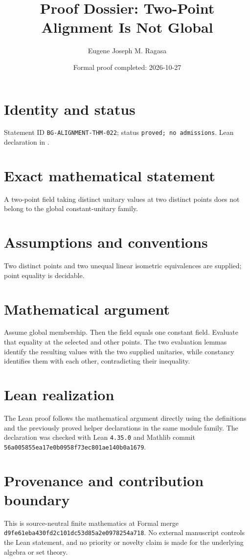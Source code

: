 \documentclass[11pt]{article}
\title{Proof Dossier: Two-Point Alignment Is Not Global}
\author{Eugene Joseph M. Ragasa}
\date{Formal proof completed: 2026-10-27}
\begin{document}
\raggedright
\maketitle

\section{Identity and status}
Statement ID \texttt{BG-ALIGNMENT-THM-022}; status \texttt{proved; no admissions}.  Lean declaration
 in
.

\section{Exact mathematical statement}
A two-point field taking distinct unitary values at two distinct points does not belong to the global constant-unitary family.

\section{Assumptions and conventions}
Two distinct points and two unequal linear isometric equivalences are supplied; point equality is decidable.

\section{Mathematical argument}
Assume global membership.  Then the field equals one constant field.  Evaluate that equality at the selected and other points.  The two evaluation lemmas identify the resulting values with the two supplied unitaries, while constancy identifies them with each other, contradicting their inequality.

\section{Lean realization}
The Lean proof follows the mathematical argument directly using the definitions and the
previously proved helper declarations in the same module family.  The declaration was checked
with Lean \texttt{4.35.0} and Mathlib commit \texttt{56a005855ea17e0b0958f73ec801ae140b0a1679}.

\section{Provenance and contribution boundary}
This is source-neutral finite mathematics at Formal merge
\texttt{d9fe61eba430fd2c101dc53d85a2e0978254a718}.  No external manuscript controls the Lean statement, and no priority or
novelty claim is made for the underlying algebra or set theory.
\end{document}
